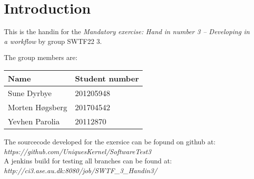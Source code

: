 \section{Introduction}

This is the handin for the \textit{Mandatory exercise: Hand in number 3 – Developing in a workflow} by group SWTF22 3.

The group members are:

\begin{table}[h]
\centering
\begin{tabular}{|l|l|}
\hline
Name & Student number\\
\hline
Sune Dyrbye & 201205948\\
Morten Høgsberg & 201704542 \\
Yevhen Parolia & 20112870\\
\hline
\end{tabular}
\end{table}

The sourcecode developed for the exersice can be fopund on github at:\\ 
\textit{https://github.com/UniquesKernel/SoftwareTest3} \\

A jenkins build for testing all branches can be found at:\\
\textit{http://ci3.ase.au.dk:8080/job/SWTF\_3\_Handin3/}

\newpage
